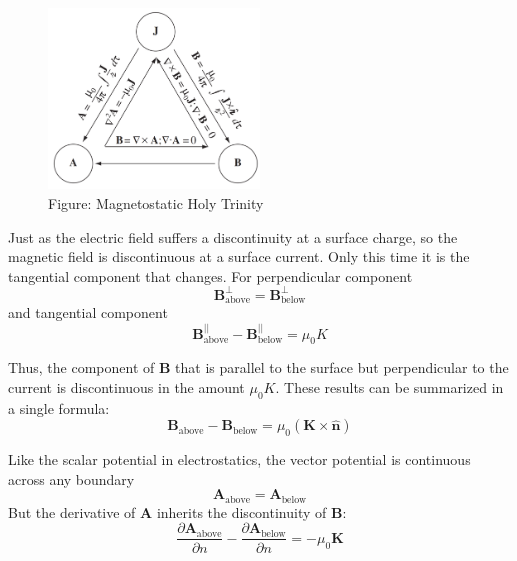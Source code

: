 \documentclass[../../../main.tex]{subfiles}
\begin{document}
\begin{figure}[ht]
    \centering
    \includegraphics[width=0.5\textwidth]{../Rss/Electromagnetism/Magnetostatics/MagnetostaticsHolyTrinity}
    \caption*{Figure: Magnetostatic Holy Trinity}
\end{figure}

Just as the electric ﬁeld suffers a discontinuity at a surface charge, so the magnetic ﬁeld is discontinuous at a surface current. Only this time it is the tangential component that changes. For perpendicular component
\begin{equation*}
    \mathbf{B}_\text{above}^{\bot}=\mathbf{B}_\text{below}^{\bot}
\end{equation*}
and tangential component
\begin{equation*}
    \mathbf{B}_\text{above}^{||}-\mathbf{B}_\text{below}^{||}=\mu_0K
\end{equation*}

Thus, the component of $\mathbf{B}$ that is parallel to the surface but perpendicular to the current is discontinuous in the amount $\mu_0K$. These results can be summarized in a single formula:
\begin{equation*}
    \mathbf{B}_\text{above}-\mathbf{B}_\text{below}=\mu_0(\mathbf{K}\times\mathbf{\hat{n}})
\end{equation*}

Like the scalar potential in electrostatics, the vector potential is continuous
across any boundary
\begin{equation*}
    \mathbf{A}_\text{above}=\mathbf{A}_\text{below}
\end{equation*}
But the derivative of \textbf{A} inherits the discontinuity of \textbf{B}:
\begin{equation*}
    \frac{\partial \mathbf{A}_\text{above}}{ \partial n}-\frac{\partial \mathbf{A}_\text{below}}{\partial n}= -\mu_0\mathbf{K}
\end{equation*}
\end{document}
